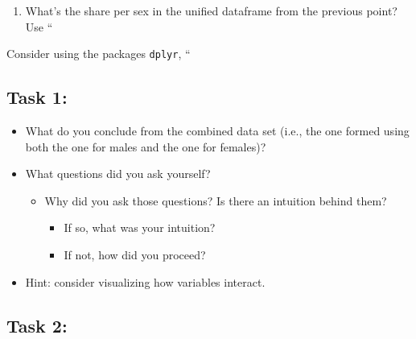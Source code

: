 \documentclass[
]{book}
\providecommand{\tightlist}{%
  \setlength{\itemsep}{0pt}\setlength{\parskip}{0pt}}
\begin{document}
\begin{enumerate}
\def\labelenumi{\arabic{enumi}.}
\setcounter{enumi}{3}
\tightlist
\item
  What's the share per sex in the unified dataframe from the previous point? Use ``
\end{enumerate}

Consider using the packages \texttt{dplyr}, ``

\hypertarget{task-1}{%
\subsection{Task 1:}\label{task-1}}

\begin{itemize}
\tightlist
\item
  What do you conclude from the combined data set (i.e., the one formed using both the one for males and the one for females)?
\item
  What questions did you ask yourself?

  \begin{itemize}
  \tightlist
  \item
    Why did you ask those questions? Is there an intuition behind them?

    \begin{itemize}
    \tightlist
    \item
      If so, what was your intuition?
    \item
      If not, how did you proceed?
    \end{itemize}
  \end{itemize}
\item
  Hint: consider visualizing how variables interact.
\end{itemize}

\hypertarget{task-2}{%
\subsection{Task 2:}\label{task-2}}
\end{document}
